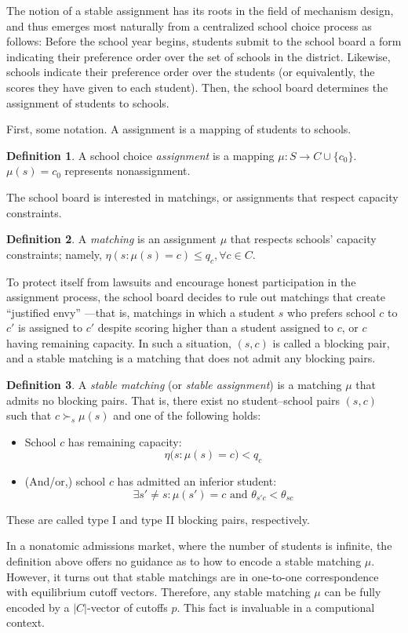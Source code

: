 \documentclass[12pt]{article}
\numberwithin{equation}{subsection}
\theoremstyle{definition}
\newtheorem{definition}{Definition}
\begin{document}
The notion of a stable assignment has its roots in the field of mechanism design, and thus emerges most naturally from a centralized school choice process as follows: Before the school year begins, students submit to the school board a form indicating their preference order over the set of schools in the district. Likewise, schools indicate their preference order over the students (or equivalently, the scores they have given to each student). Then, the school board determines the assignment of students to schools.

First, some notation. A assignment is a mapping of students to schools.
\begin{definition}
A school choice \emph{assignment} is a mapping $\mu: S \to C \cup \{c_0\}$. $\mu(s) = c_0$ represents nonassignment.
\end{definition}
The school board is interested in matchings, or assignments that respect capacity constraints. 
\begin{definition}
A \emph{matching} is an assignment $\mu$ that respects schools' capacity constraints; namely, $\eta (s: \mu(s) = c) \leq q_c, \forall c \in C$. 
\end{definition}
To protect itself from lawsuits and encourage honest participation in the assignment process, the school board decides to rule out matchings that create ``justified envy'' \parencite[][7]{expandingchoice}---that is, matchings in which a student $s$ who prefers school $c$ to $c'$ is assigned to $c'$ despite scoring higher than a student assigned to $c$, or $c$ having remaining capacity. In such a situation, $(s, c)$ is called a blocking pair, and a stable matching is a matching that does not admit any blocking pairs.
\begin{definition}
A \emph{stable matching} (or \emph{stable assignment}) is a matching $\mu$ that admits no blocking pairs. That is, there exist no student--school pairs $(s, c)$ such that $c \succ_s \mu(s)$ and one of the following holds:
\begin{itemize}
\item School $c$ has remaining capacity:
\[\eta\bigl(s: \mu(s) = c \bigr) < q_c\]
\item (And/or,) school $c$ has admitted an inferior student:
\[\exists s' \neq s: \mu(s') = c \text{ and } \theta_{s'c} < \theta_{sc}\] 
\end{itemize}
These are called type I and type II blocking pairs, respectively.
\end{definition}

In a nonatomic admissions market, where the number of students is infinite, the definition above offers no guidance as to how to encode a stable matching $\mu$. However, it turns out that stable matchings are in one-to-one correspondence with equilibrium cutoff vectors. Therefore, any stable matching $\mu$ can be fully encoded by a $|C|$-vector of cutoffs $p$. This fact is invaluable in a computional context.
\end{document}
